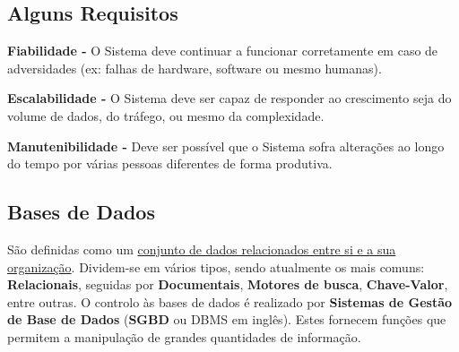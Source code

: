 \documentclass{article}
\begin{document}
\subsection{Alguns Requisitos}

\begin{flushleft}
  \item \textbf{Fiabilidade -} O Sistema deve continuar a funcionar corretamente em caso de adversidades (ex: falhas de hardware, software ou mesmo humanas).
  \item \textbf{Escalabilidade -} O Sistema deve ser capaz de responder ao crescimento seja do volume de dados, do tráfego, ou mesmo da complexidade.
  \item \textbf{Manutenibilidade -} Deve ser possível que o Sistema sofra alterações ao longo do tempo por várias pessoas diferentes de forma produtiva.
\end{flushleft}

\pagebreak

\subsection{Bases de Dados}

\begin{flushleft}
  São definidas como um \uline{conjunto de dados relacionados entre si e a sua organização}.
  \vspace{2mm}
  Dividem-se em vários tipos, sendo atualmente os mais comuns: \textbf{Relacionais}, seguidas por
  \textbf{Documentais}, \textbf{Motores de busca}, \textbf{Chave-Valor}, entre outras. 
  \vspace{2mm}
  O controlo às bases de dados é realizado por \textbf{Sistemas de Gestão de Base de Dados} (\textbf{SGBD}
  ou DBMS em inglês). Estes fornecem funções que permitem a manipulação de grandes
  quantidades de informação.
\end{flushleft}



\vspace{3mm}
\end{document}

